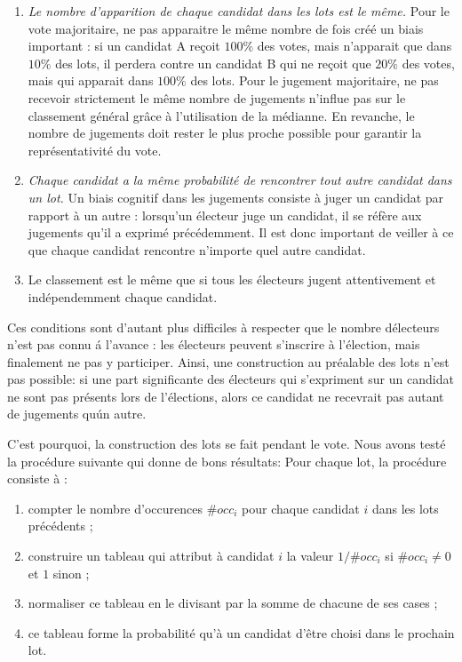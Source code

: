 \documentclass[conference]{IEEEtran}
\begin{document}
\begin{enumerate}
  \item \emph{Le nombre d'apparition de chaque candidat dans les lots est le m\^eme.} Pour le vote majoritaire, ne pas apparaitre le m\^eme nombre de fois cr\'e\'e un biais important : si un candidat A re\c{c}oit $100\%$ des votes, mais n'apparait que dans $10\%$ des lots, il perdera contre un candidat B qui ne re\c{c}oit que $20\%$ des votes, mais qui apparait dans $100\%$ des lots. Pour le jugement majoritaire, ne pas recevoir strictement le m\^eme nombre de jugements n'influe pas sur le classement g\'en\'eral gr\^ace \`a l'utilisation de la m\'edianne. En revanche, le nombre de jugements doit rester le plus proche possible pour garantir la repr\'esentativit\'e du vote. 
  \item \emph{Chaque candidat a la m\^eme probabilit\'e de rencontrer tout autre candidat dans un lot.} Un biais cognitif dans les jugements consiste \`a juger un candidat par rapport \`a un autre : lorsqu'un \'electeur juge un candidat, il se r\'ef\`ere aux jugements qu'il a exprim\'e pr\'ec\'edemment. Il est donc important de veiller \`a ce que chaque candidat rencontre n'importe quel autre candidat. 
  \item Le classement est le m\^eme que si tous les \'electeurs jugent attentivement et ind\'ependemment chaque candidat. 
\end{enumerate}

Ces conditions sont d'autant plus difficiles \`a respecter que le nombre d\'electeurs n'est pas connu \'a l'avance : les \'electeurs peuvent s'inscrire \`a l'\'election, mais finalement ne pas y participer. Ainsi, une construction au pr\'ealable des lots n'est pas possible: si une part significante des \'electeurs qui s'expriment sur un candidat ne sont pas pr\'esents lors de l'\'elections, alors ce candidat ne recevrait pas autant de jugements qu\'un autre.

C'est pourquoi, la construction des lots se fait pendant le vote. Nous avons test\'e la proc\'edure suivante qui donne de bons r\'esultats:
Pour chaque lot, la proc\'edure consiste \`a :
\begin{enumerate}
  \item compter le nombre d'occurences $\#occ_i$ pour chaque candidat $i$ dans les lots pr\'ec\'edents ;
  \item construire un tableau qui attribut \`a candidat $i$ la valeur $1/\#occ_i$ si $\#occ_i \ne 0$ et $1$ sinon ;
  \item normaliser ce tableau en le divisant par la somme de chacune de ses cases ;
  \item ce tableau forme la probabilit\'e qu'\`a un candidat d'\^etre choisi dans le prochain lot.
\end{enumerate}
\end{document}
